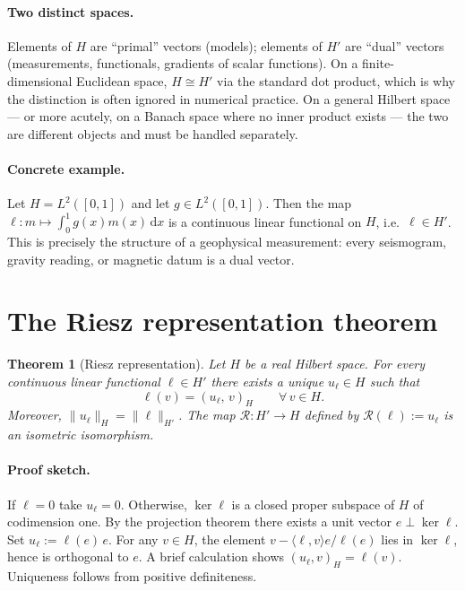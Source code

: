 \documentclass[11pt,twoside,openright]{book}
\theoremstyle{plain}
\newtheorem{theorem}{Theorem}[chapter]
\theoremstyle{definition}
\theoremstyle{remark}
\newcommand{\Riesz}{\mathcal{R}}
\begin{document}
\paragraph{Two distinct spaces.}
Elements of $H$ are ``primal'' vectors (models); elements of $H'$ are
``dual'' vectors (measurements, functionals, gradients of scalar
functions). On a finite-dimensional Euclidean space, $H \cong H'$ via
the standard dot product, which is why the distinction is often ignored
in numerical practice. On a general Hilbert space --- or more acutely, on
a Banach space where no inner product exists --- the two are different
objects and must be handled separately.

\paragraph{Concrete example.}
Let $H = L^2([0,1])$ and let $g \in L^2([0,1])$. Then the map $\ell:
m \mapsto \int_0^1 g(x) m(x)\,\mathrm{d}x$ is a continuous linear
functional on $H$, i.e.\ $\ell \in H'$. This is precisely the structure
of a geophysical measurement: every seismogram, gravity reading, or
magnetic datum is a dual vector.

\section{The Riesz representation theorem}
\label{sec:riesz-theorem}

\begin{theorem}[Riesz representation]
\label{thm:riesz}
Let $H$ be a real Hilbert space. For every continuous linear functional
$\ell \in H'$ there exists a unique $u_\ell \in H$ such that
\begin{equation}
  \label{eq:riesz-rep}
  \ell(v) = (u_\ell,\, v)_H \qquad \forall\, v \in H.
\end{equation}
Moreover, $\|u_\ell\|_H = \|\ell\|_{H'}$. The map $\Riesz: H' \to H$
defined by $\Riesz(\ell) := u_\ell$ is an isometric isomorphism.
\end{theorem}

\paragraph{Proof sketch.}
If $\ell = 0$ take $u_\ell = 0$. Otherwise, $\ker\ell$ is a closed
proper subspace of $H$ of codimension one. By the projection theorem
there exists a unit vector $e \perp \ker\ell$. Set $u_\ell :=
\ell(e)\,e$. For any $v \in H$, the element $v - \langle\ell,v\rangle e /
\ell(e)$ lies in $\ker\ell$, hence is orthogonal to $e$. A brief
calculation shows $(u_\ell, v)_H = \ell(v)$. Uniqueness follows from
positive definiteness.
\end{document}
